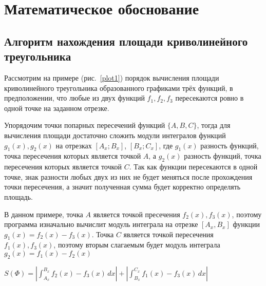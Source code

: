 \documentclass[a4paper,12pt,titlepage,finall]{article}
\begin{document}
\newpage

\section{Математическое обоснование}
\subsection{Алгоритм нахождения площади криволинейного треугольника}
Рассмотрим на примере (рис.~\ref{plot1}) порядок вычисления площади криволинейного треугольника образованного графиками трёх функций, в предположении, что любые из двух функций $f_1,f_2,f_3$ пересекаются ровно в одной точке на заданном отрезке.

Упорядочим точки попарных пересечений функций $\{A,B,C\}$, тогда для вычисления
площади достаточно сложить модули интегралов функций $g_1(x),g_2(x)$ на отрезках 
$[A_x;B_x]$, $[B_x;C_x]$, где $g_1(x)$ разность функций, точка пересечения которых 
является точкой $A$, а $g_2(x)$ разность функций, точка пересечения которых 
является точкой $C$. Так как функции пересекаются в одной точке, знак разности любых двух из них не будет меняться после прохождения точки пересечения, а значит полученная сумма будет корректно определять площадь.

В данном примере, точка $A$ является точкой пресечения $f_2(x),f_3(x)$, поэтому
программа изначально вычислит модуль интеграла на отрезке $[A_x,B_x]$ функции 
$g_1(x) = f_2(x) - f_3(x)$. Точка $C$ является точкой пересечения $f_1(x), f_3(x)$,
поэтому вторым слагаемым будет модуль интеграла $g_2(x) = f_1(x) - f_2(x)$

$S(\Phi) = |\int_{A_x}^{B_x} f_2(x) - f_3(x)\,dx| + |\int_{B_x}^{C_x} f_1(x) - f_3(x)\,dx|$
\end{document}
